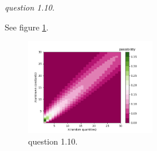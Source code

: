 \documentclass{article}
\begin{document}
\vspace{\baselineskip}
\textit{question 1.10.}

See figure \ref{fig:1-10}.

\begin{figure}[h!]
  \centering
  \includegraphics[width=0.5\textwidth]{1-10}
  \caption{question 1.10.}
  \label{fig:1-10}
\end{figure}
\end{document}
